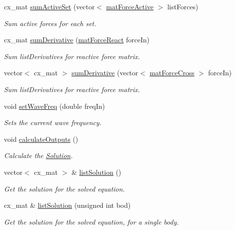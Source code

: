 \begin{DoxyCompactItemize}
cx\-\_\-mat \hyperlink{class_motion_solver_a21eaf26eff4bdfd232e85d5c55b2aa9d}{sum\-Active\-Set} (vector$<$ \hyperlink{classmat_force_active}{mat\-Force\-Active} $>$ list\-Forces)
\begin{DoxyCompactList}\small\item\em Sum active forces for each set. \end{DoxyCompactList}\item 
cx\-\_\-mat \hyperlink{class_motion_solver_a07eeaf738ebae2ce078de86e61132220}{sum\-Derivative} (\hyperlink{classmat_force_react}{mat\-Force\-React} force\-In)
\begin{DoxyCompactList}\small\item\em Sum list\-Derivatives for reactive force matrix. \end{DoxyCompactList}\item 
vector$<$ cx\-\_\-mat $>$ \hyperlink{class_motion_solver_aff8388d73e039e7ddf65703175f6420d}{sum\-Derivative} (vector$<$ \hyperlink{classmat_force_cross}{mat\-Force\-Cross} $>$ force\-In)
\begin{DoxyCompactList}\small\item\em Sum list\-Derivatives for reactive force matrix. \end{DoxyCompactList}\item 
void \hyperlink{class_motion_solver_a5deee421d26ef9729e0a870fd48b4403}{set\-Wave\-Freq} (double freq\-In)
\begin{DoxyCompactList}\small\item\em Sets the current wave frequency. \end{DoxyCompactList}\item 
\hypertarget{class_motion_solver_a28190e2b9c937f8889ba37db35069c52}{void \hyperlink{class_motion_solver_a28190e2b9c937f8889ba37db35069c52}{calculate\-Outputs} ()}\label{class_motion_solver_a28190e2b9c937f8889ba37db35069c52}

\begin{DoxyCompactList}\small\item\em Calculate the \hyperlink{class_solution}{Solution}. \end{DoxyCompactList}\item 
vector$<$ cx\-\_\-mat $>$ \& \hyperlink{class_motion_solver_a8391c0f67d1d711294f2e6f44363b9bf}{list\-Solution} ()
\begin{DoxyCompactList}\small\item\em Get the solution for the solved equation. \end{DoxyCompactList}\item 
cx\-\_\-mat \& \hyperlink{class_motion_solver_a20a5c24bd163adb5654eceee6030f898}{list\-Solution} (unsigned int bod)
\begin{DoxyCompactList}\small\item\em Get the solution for the solved equation, for a single body. \end{DoxyCompactList}\end{DoxyCompactItemize}
